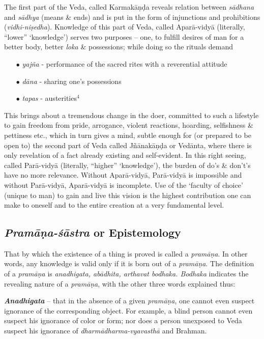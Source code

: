 The first part of the Veda, called Karmakāṇḍa reveals relation between  {\sl sādhana} and {\sl sādhya} (means \& ends) and is put in the form of injunctions and prohibitions ({\sl vidhi-niṣedha}). Knowledge of this part of Veda, called Aparā-vidyā (literally, ``lower'' `knowledge') serves two purposes -- one, to fulﬁll desires of man for a better body, better {\sl loka} \& possessions; while doing so the rituals demand 
\begin{itemize}
\item[$\bullet$] {\sl yajña} - performance of the sacred rites with a reverential attitude 

\item[$\bullet$] {\sl dāna} - sharing one's possessions 

\item[$\bullet$] {\sl tapas} - austerities$^{4}$ 
\end{itemize}

This brings about a tremendous change in the doer, committed to such a lifestyle to gain freedom from pride, arrogance, violent reactions, hoarding, selﬁshness \& pettiness etc., which in turn gives a mind, subtle enough for (or prepared to be open to) the second part of Veda called Jñānakāṇḍa or Vedānta, where there is only revelation of a fact already existing and self-evident. In this right seeing, called Parā-vidyā (literally, ``higher'' `knowledge'), the burden of do’s \& don't's have no more relevance. Without Aparā-vidyā, Parā-vidyā is impossible and without Parā-vidyā, Aparā-vidyā is incomplete. Use of the `faculty of choice' (unique to man) to gain and live this vision is the highest contribution one can make to oneself and to the entire creation at a very fundamental level.

\subsection{{{\sl\bfseries Pramāṇa-śāstra}\relax} or Epistemology}\label{art12-sec2.2}

That by which the existence of a thing is proved is called a {\sl pramāṇa}. In other words, any knowledge is valid only if it is born out of a {\sl pramāṇa}. The deﬁnition of a {\sl pramāṇa} is {\sl anadhigata, abādhita, arthavat bodhaka. Bodhaka} indicates the revealing nature of a {\sl pramāṇa}, with the other three words explained thus:

{{\sl\bfseries Anadhigata}\relax} -- that in the absence of a given {\sl pramāṇa}, one cannot even suspect ignorance of the corresponding object. For example, a blind person cannot even suspect his ignorance of color or form; nor does a person unexposed to Veda suspect his ignorance of {\sl dharmādharma-vyavasthā} and Brahman.


